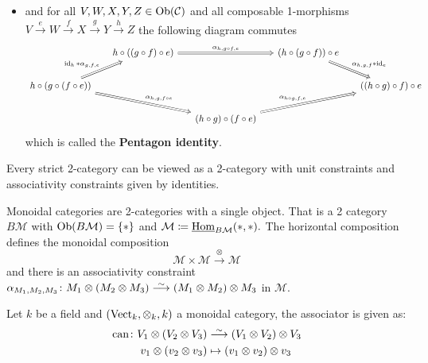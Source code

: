 \begin{defi}
\begin{itemize}
		\item 
		and for all $ V , W ,X ,Y ,Z \in \operatorname{Ob} ( \mathcal{ C } )$ and all composable 1-morphisms 
		\newline
		$ V \xrightarrow{e} W \xrightarrow{f} X \xrightarrow{ g } Y \xrightarrow{ h } Z $
		the following diagram commutes
		\[
		\begin{tikzcd}[column sep=0.5cm]
			& h \circ ( ( g \circ f ) \circ e )
			\ar[rr, Rightarrow, " \alpha_{ h , g \circ f , e }"]
			&&
			( h \circ ( g \circ f ) ) \circ e 
			\ar[rd, Rightarrow, " \alpha_{ h , g , f } * \id_e"]
			\\
			h \circ ( g \circ ( f \circ e ))
			\ar[ru, Rightarrow, "\id_{h} * \alpha_{g , f , e}"]
			\ar[rrd, Rightarrow," \alpha_{ h , g , f \circ e }"]
			&&&&
			(( h \circ g ) \circ f ) \circ e
			\\
			&&
			( h \circ g ) \circ ( f \circ e )
			\ar[rru, Rightarrow, " \alpha_{ h \circ g , f , e }"]
		\end{tikzcd}
		\]
		which is called the \textbf{Pentagon identity}.
	\end{itemize}
\end{defi}


\begin{exmp}
	Every strict 2-category can be viewed as a 2-category with unit constraints and associativity constraints given by identities.
\end{exmp}

\begin{defi}
	Monoidal categories are 2-categories with a single object.
	That is a 2 category
	$ B \mathcal{ M }$ with $ \operatorname{Ob} ( B \mathcal{ M } ) = \{ * \} $ and $ \mathcal{ M } \coloneqq \operatorname{\underline{Hom}}_{B \mathcal{ M} } ( * , * ).$
	The horizontal composition defines the monoidal composition
	\[
		\mathcal{ M } \times \mathcal{ M }
		\xrightarrow{ \otimes }
		\mathcal{M}
	\]
	and there is an associativity constraint $ \alpha_{M_1 , M_2 , M_3 } \colon M_1 \otimes ( M_2 \otimes M_3 ) \isomorphism ( M_1 \otimes M_2 ) \otimes M_3$ in $\mathcal{ M }$.
\end{defi}

\begin{exmp}
	Let $ k $ be a field and $ ( \operatorname{Vect}_k , \otimes_k , k ) $ a monoidal category, the associator is given as:
	\begin{align*}
		\can \colon V_1 \otimes ( V_2 \otimes V_3 ) 
		&\isomorphism 
		( V_1 \otimes V_2 ) \otimes V_3
		\\
		v_1 \otimes ( v_2 \otimes v_3 )
		&\mapsto
		(v_1 \otimes v_2) \otimes v_3
	\end{align*}
\end{exmp}


